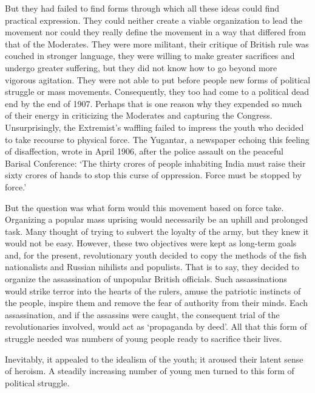 But they had failed to find forms through which all these ideas could find practical expression. They could neither create a viable organization to lead the movement nor could they really define the movement in a way that differed from that of the Moderates. They were more militant, their critique of British rule was couched in stronger language, they were willing to make greater sacrifices and undergo greater suffering, but they did not know how to go beyond more vigorous agitation. They were not able to put before people new forms of political struggle or mass movements. Consequently, they too had come to a political dead end by the end of 1907. Perhaps that is one reason why they expended so much of their energy in criticizing the Moderates and capturing the Congress. Unsurprisingly, the Extremist's waffling failed to impress the youth who decided to take recourse to physical force. The Yugantar, a newspaper echoing this feeling of disaffection, wrote in April 1906, after the police assault on the peaceful Barisal Conference: `The thirty crores of people inhabiting India must raise their sixty crores of hands to stop this curse of oppression. Force must be stopped by force.'

But the question was what form would this movement based on force take. Organizing a popular mass uprising would necessarily be an uphill and prolonged task. Many thought of trying to subvert the loyalty of the army, but they knew it would not be easy. However, these two objectives were kept as long-term goals and, for the present, revolutionary youth decided to copy the methods of the fish nationalists and Russian nihilists and populists. That is to say, they decided to organize the assassination of unpopular British officials. Such assassinations would strike terror into the hearts of the rulers, amuse the patriotic instincts of the people, inspire them and remove the fear of authority from their minds. Each assassination, and if the assassins were caught, the consequent trial of the revolutionaries involved, would act as `propaganda by deed'. All that this form of struggle needed was numbers of young people ready to sacrifice their lives.

Inevitably, it appealed to the idealism of the youth; it aroused their latent sense of heroism. A steadily increasing number of young men turned to this form of political struggle.

